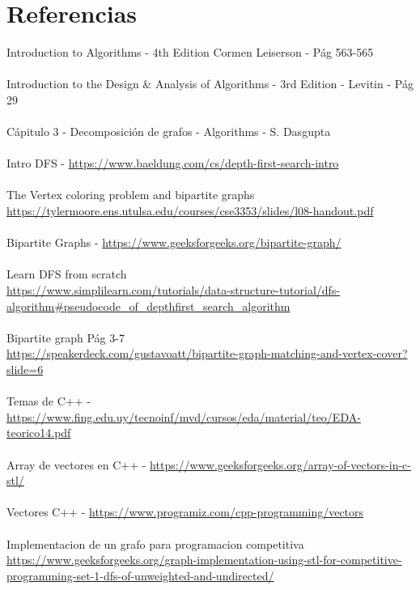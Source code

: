 \documentclass{article}
\begin{document}
\section{Referencias}
Introduction to Algorithms - 4th Edition Cormen Leiserson - Pág 563-565\\\\
Introduction to the Design \& Analysis of Algorithms - 3rd Edition - Levitin - Pág 29\\\\
Cápitulo 3 - Decomposición de grafos - Algorithms - S. Dasgupta\\\\
Intro DFS - \url{https://www.baeldung.com/cs/depth-first-search-intro}\\\\
The Vertex coloring problem and bipartite graphs \\ \url{https://tylermoore.ens.utulsa.edu/courses/cse3353/slides/l08-handout.pdf}\\\\
Bipartite Graphs - \url{https://www.geeksforgeeks.org/bipartite-graph/}\\\\
Learn DFS from scratch \\ \url{https://www.simplilearn.com/tutorials/data-structure-tutorial/dfs-algorithm#pseudocode_of_depthfirst_search_algorithm}\\\\
Bipartite graph Pág 3-7 \\ \url{https://speakerdeck.com/gustavoatt/bipartite-graph-matching-and-vertex-cover?slide=6}\\\\
Temas de C++ - \url{https://www.fing.edu.uy/tecnoinf/mvd/cursos/eda/material/teo/EDA-teorico14.pdf}\\\\
Array de vectores en C++ - \url{https://www.geeksforgeeks.org/array-of-vectors-in-c-stl/}\\\\
Vectores C++ - \url{https://www.programiz.com/cpp-programming/vectors}\\\\
Implementacion de un grafo para programacion competitiva \\ \url{https://www.geeksforgeeks.org/graph-implementation-using-stl-for-competitive-programming-set-1-dfs-of-unweighted-and-undirected/}
\end{document}
